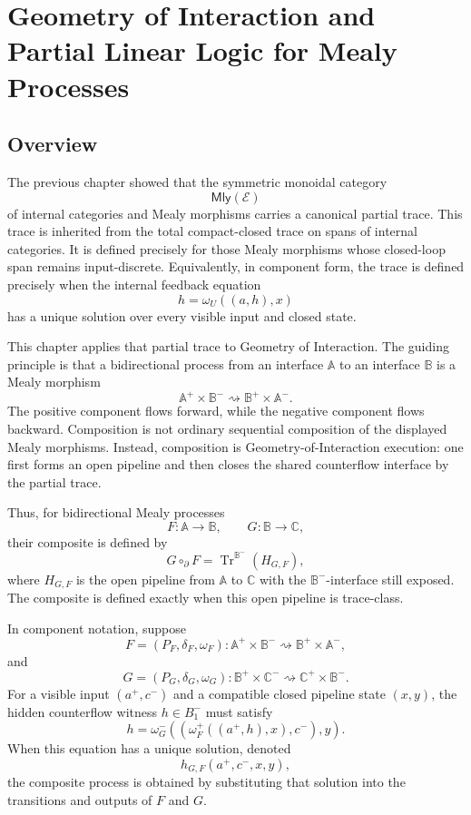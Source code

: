 \chapter{Geometry of Interaction and Partial Linear Logic for Mealy Processes}
\label{ch:goi-partial-linear-logic-mealy}

\section{Overview}
\label{sec:goi-overview}

The previous chapter showed that the symmetric monoidal category
\[
\mathsf{Mly}(\mathcal E)
\]
of internal categories and Mealy morphisms carries a canonical partial trace.
This trace is inherited from the total compact-closed trace on spans of
internal categories.  It is defined precisely for those Mealy morphisms whose
closed-loop span remains input-discrete.  Equivalently, in component form, the
trace is defined precisely when the internal feedback equation
\[
h=\omega_U((a,h),x)
\]
has a unique solution over every visible input and closed state.

This chapter applies that partial trace to Geometry of Interaction.  The
guiding principle is that a bidirectional process from an interface
\(\mathbb A\) to an interface \(\mathbb B\) is a Mealy morphism
\[
\mathbb A^+\times\mathbb B^-
\rightsquigarrow
\mathbb B^+\times\mathbb A^-.
\]
The positive component flows forward, while the negative component flows
backward.  Composition is not ordinary sequential composition of the displayed
Mealy morphisms.  Instead, composition is Geometry-of-Interaction execution:
one first forms an open pipeline and then closes the shared counterflow
interface by the partial trace.

Thus, for bidirectional Mealy processes
\[
F:\mathbb A\to\mathbb B,
\qquad
G:\mathbb B\to\mathbb C,
\]
their composite is defined by
\[
G\circ_{\partial}F
=
\operatorname{Tr}^{\mathbb B^-}(H_{G,F}),
\]
where \(H_{G,F}\) is the open pipeline from \(\mathbb A\) to \(\mathbb C\)
with the \(\mathbb B^-\)-interface still exposed.  The composite is defined
exactly when this open pipeline is trace-class.

In component notation, suppose
\[
F=(P_F,\delta_F,\omega_F):
\mathbb A^+\times\mathbb B^-
\rightsquigarrow
\mathbb B^+\times\mathbb A^-,
\]
and
\[
G=(P_G,\delta_G,\omega_G):
\mathbb B^+\times\mathbb C^-
\rightsquigarrow
\mathbb C^+\times\mathbb B^-.
\]
For a visible input \((a^+,c^-)\) and a compatible closed pipeline state
\((x,y)\), the hidden counterflow witness \(h\in B^-_1\) must satisfy
\[
h
=
\omega_G^-
\left(
\left(
\omega_F^+((a^+,h),x),
c^-
\right),
y
\right).
\]
When this equation has a unique solution, denoted
\[
h_{G,F}(a^+,c^-,x,y),
\]
the composite process is obtained by substituting that solution into the
transitions and outputs of \(F\) and \(G\).

